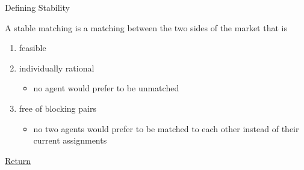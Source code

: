\documentclass{beamer}
\begin{document}
\begin{frame}{Defining Stability}

A \hypertarget{definestable}{stable} matching is a matching between the two sides of the market that is
\begin{enumerate}
    \item feasible 
    \item individually rational
        \begin{itemize}
            \item no agent would prefer to be unmatched 
        \end{itemize}
    \item free of blocking pairs
    \begin{itemize}
        \item no two agents would prefer to be matched to each other instead of their current assignments
    \end{itemize}
\end{enumerate}

\hyperlink{r_definestable}{Return}
\end{frame}
\end{document}
